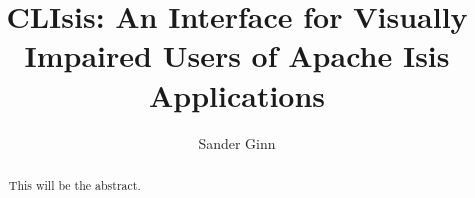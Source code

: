 \documentclass{uva_bachelor_thesis}
\title{CLIsis: An Interface for Visually Impaired Users of Apache Isis Applications}
\author{Sander Ginn}
\begin{document}
\maketitle

\begin{abstract}
This will be the abstract.
\end{abstract}

\tableofcontents









\nocite{*}

\end{document}
